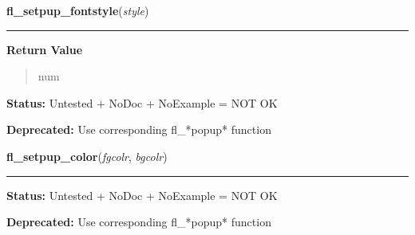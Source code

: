     \label{xformslib:deprecated:fl_setpup_default_fontstyle}

    \vspace{0.5ex}

\hspace{.8\funcindent}\begin{boxedminipage}{\funcwidth}

    \raggedright \textbf{fl\_setpup\_fontstyle}(\textit{style})

    \vspace{-1.5ex}

    \rule{\textwidth}{0.5\fboxrule}
\setlength{\parskip}{2ex}
\setlength{\parskip}{1ex}
      \textbf{Return Value}
    \vspace{-1ex}

      \begin{quote}
      num

      \end{quote}

\textbf{Status:} Untested + NoDoc + NoExample = NOT OK



\textbf{Deprecated:} Use corresponding fl\_*popup* function



    \end{boxedminipage}

    \label{xformslib:deprecated:fl_setpup_default_color}

    \vspace{0.5ex}

\hspace{.8\funcindent}\begin{boxedminipage}{\funcwidth}

    \raggedright \textbf{fl\_setpup\_color}(\textit{fgcolr}, \textit{bgcolr})

    \vspace{-1.5ex}

    \rule{\textwidth}{0.5\fboxrule}
\setlength{\parskip}{2ex}
\setlength{\parskip}{1ex}
\textbf{Status:} Untested + NoDoc + NoExample = NOT OK



\textbf{Deprecated:} Use corresponding fl\_*popup* function



    \end{boxedminipage}

